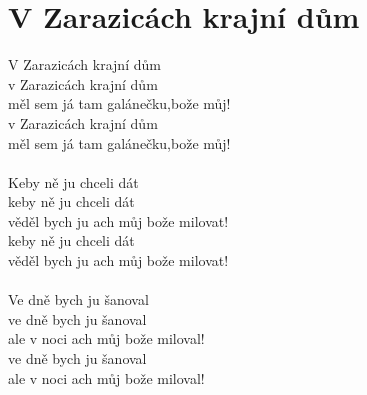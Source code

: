 \section{V Zarazicách krajní dům}
V Zarazicách krajní dům\\
v Zarazicách krajní dům\\
měl sem já tam galánečku,bože můj!\\
v Zarazicách krajní dům\\
měl sem já tam galánečku,bože můj!\\
\\
Keby ně ju chceli dát\\
keby ně ju chceli dát\\
věděl bych ju ach můj bože milovat!\\
keby ně ju chceli dát\\
věděl bych ju ach můj bože milovat!\\
\\
Ve dně bych ju šanoval\\
ve dně bych ju šanoval\\
ale v noci ach můj bože miloval!\\
ve dně bych ju šanoval\\
ale v noci ach můj bože miloval!\\